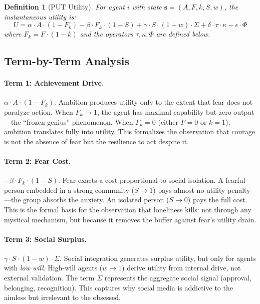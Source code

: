 \documentclass[12pt, a4paper]{article}
\newtheorem{definition}{Definition}[section]
\theoremstyle{remark}
\newcommand{\Fk}{F_k}
\begin{document}
\begin{definition}[PUT Utility]\label{def:utility}
For agent $i$ with state $\mathbf{s} = (A, F, k, S, w)$, the
instantaneous utility is:
\begin{equation}\label{eq:utility}
    U = \alpha \cdot A \cdot (1 - \Fk)
      - \beta \cdot \Fk \cdot (1 - S)
      + \gamma \cdot S \cdot (1 - w) \cdot \Sigma
      + \delta \cdot \tau \cdot \kappa
      - \epsilon \cdot \Phi
\end{equation}
where $\Fk = F \cdot (1 - k)$ and the operators $\tau, \kappa, \Phi$
are defined below.
\end{definition}

\subsection{Term-by-Term Analysis}

\paragraph{Term 1: Achievement Drive.}
$\alpha \cdot A \cdot (1 - \Fk)$. Ambition produces utility only to the
extent that fear does not paralyze action. When $\Fk \to 1$, the agent
has maximal capability but zero output---the ``frozen genius'' phenomenon.
When $\Fk = 0$ (either $F = 0$ or $k = 1$), ambition translates fully
into utility. This formalizes the observation that courage is not the
absence of fear but the resilience to act despite it.

\paragraph{Term 2: Fear Cost.}
$-\beta \cdot \Fk \cdot (1 - S)$. Fear exacts a cost proportional to
social isolation. A fearful person embedded in a strong community ($S \to 1$)
pays almost no utility penalty---the group absorbs the anxiety. An isolated
person ($S \to 0$) pays the full cost. This is the formal basis for the
observation that loneliness kills: not through any mystical mechanism,
but because it removes the buffer against fear's utility drain.

\paragraph{Term 3: Social Surplus.}
$\gamma \cdot S \cdot (1 - w) \cdot \Sigma$. Social integration generates
surplus utility, but only for agents with \emph{low will}. High-will agents
($w \to 1$) derive utility from internal drive, not external validation.
The term $\Sigma$ represents the aggregate social signal (approval,
belonging, recognition). This captures why social media is addictive to
the aimless but irrelevant to the obsessed.
\end{document}
